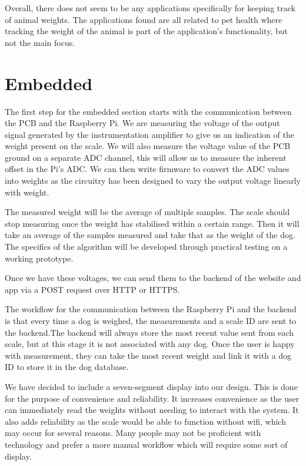 Overall, there does not seem to be any applications specifically for keeping track of animal weights. The applications found are all related to pet health where tracking the weight of the animal is part of the application’s functionality, but not the main focus.


\section{Embedded}
The first step for the embedded section starts with the communication between the PCB and the Raspberry Pi. We are measuring the voltage of the output signal generated by the instrumentation amplifier to give us an indication of the weight present on the scale. We will also measure the voltage value of the PCB ground on a separate ADC channel, this will allow us to measure the inherent offset in the Pi’s ADC. We can then write firmware to convert the ADC values into weights as the circuitry has been designed to vary the output voltage linearly with weight. 

The measured weight will be the average of multiple samples. The scale should stop measuring once the weight has stabilised within a certain range. Then it will take an average of the samples measured and take that as the weight of the dog. The specifics of the algorithm will be developed through practical testing on a working prototype. 

Once we have these voltages, we can send them to the backend of the website and app via a POST request over HTTP or HTTPS. 

The workflow for the communication between the Raspberry Pi and the backend is that every time a dog is weighed, the measurements and a scale ID are sent to the backend.The backend will always store the most recent value sent from each scale, but at this stage it is not associated with any dog. Once the user is happy with measurement, they can take the most recent weight and link it with a dog ID to store it in the dog database.

We have decided to include a seven-segment display into our design. This is done for the purpose of convenience and reliability. It increases convenience as the user can immediately read the weights without needing to interact with the system. It also adds reliability as the scale would be able to function without wifi, which may occur for several reasons. Many people may not be proficient with technology and prefer a more manual workflow which will require some sort of display. 


